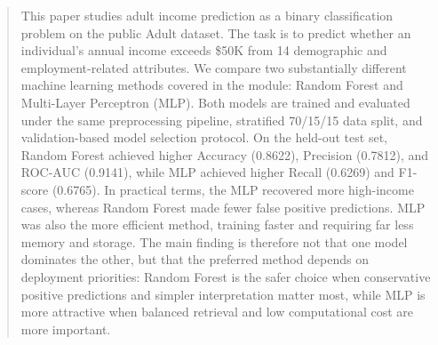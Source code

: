 \begin{abstract}
This paper studies adult income prediction as a binary classification problem on the public Adult dataset. The task is to predict whether an individual's annual income exceeds \$50K from 14 demographic and employment-related attributes. We compare two substantially different machine learning methods covered in the module: Random Forest and Multi-Layer Perceptron (MLP). Both models are trained and evaluated under the same preprocessing pipeline, stratified 70/15/15 data split, and validation-based model selection protocol. On the held-out test set, Random Forest achieved higher Accuracy (0.8622), Precision (0.7812), and ROC-AUC (0.9141), while MLP achieved higher Recall (0.6269) and F1-score (0.6765). In practical terms, the MLP recovered more high-income cases, whereas Random Forest made fewer false positive predictions. MLP was also the more efficient method, training faster and requiring far less memory and storage. The main finding is therefore not that one model dominates the other, but that the preferred method depends on deployment priorities: Random Forest is the safer choice when conservative positive predictions and simpler interpretation matter most, while MLP is more attractive when balanced retrieval and low computational cost are more important.
\end{abstract}

